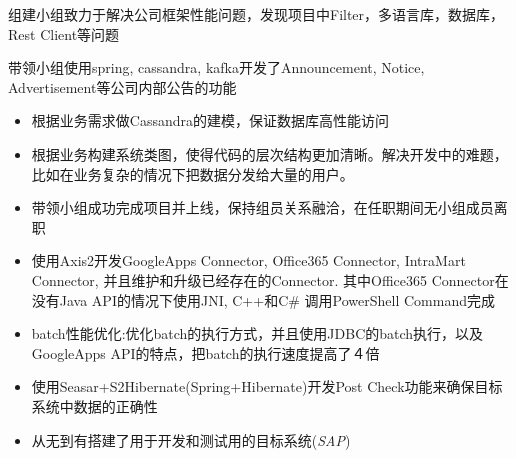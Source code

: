 \documentclass{resume}
\begin{document}
\begin{onehalfspacing}
组建小组致力于解决公司框架性能问题，发现项目中Filter，多语言库，数据库，Rest Client等问题
\end{onehalfspacing}

\begin{onehalfspacing}
带领小组使用spring, cassandra, kafka开发了Announcement, Notice, Advertisement等公司内部公告的功能
\begin{itemize}
  \item 根据业务需求做Cassandra的建模，保证数据库高性能访问
  \item 根据业务构建系统类图，使得代码的层次结构更加清晰。解决开发中的难题，比如在业务复杂的情况下把数据分发给大量的用户。
  \item 带领小组成功完成项目并上线，保持组员关系融洽，在任职期间无小组成员离职
\end{itemize}
\end{onehalfspacing}

\begin{itemize}
  \item 使用Axis2开发GoogleApps Connector, Office365 Connector, IntraMart Connector, 并且维护和升级已经存在的Connector. 其中Office365 Connector在没有Java API的情况下使用JNI, C++和C\# 调用PowerShell Command完成
  \item batch性能优化:优化batch的执行方式，并且使用JDBC的batch执行，以及GoogleApps API的特点，把batch的执行速度提高了４倍
  \item 使用Seasar+S2Hibernate(Spring+Hibernate)开发Post Check功能来确保目标系统中数据的正确性
  \item 从无到有搭建了用于开发和测试用的目标系统(\textit{SAP})
\end{itemize}

\end{document}
